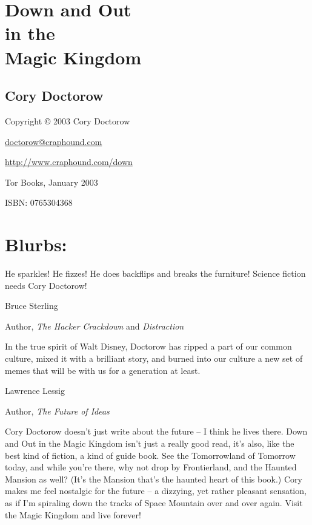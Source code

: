 


\section{Down and Out\\in the\\Magic Kingdom}

\subsection{Cory Doctorow}

Copyright © 2003 Cory Doctorow

\href{mailto:doctorow@craphound.com}{doctorow@craphound.com}

\href{http://www.craphound.com/down}{http://www.craphound.com/down}

Tor Books, January 2003

ISBN: 0765304368

\section{Blurbs:}

He sparkles! He fizzes! He does backflips and breaks the furniture!
Science fiction needs Cory Doctorow!

Bruce Sterling

Author, \emph{The Hacker Crackdown} and \emph{Distraction}

In the true spirit of Walt Disney, Doctorow has ripped a part of
our common culture, mixed it with a brilliant story, and burned
into our culture a new set of memes that will be with us for a
generation at least.

Lawrence Lessig

Author, \emph{The Future of Ideas}

Cory Doctorow doesn't just write about the future -- I think he
lives there. Down and Out in the Magic Kingdom isn't just a really
good read, it's also, like the best kind of fiction, a kind of
guide book. See the Tomorrowland of Tomorrow today, and while
you're there, why not drop by Frontierland, and the Haunted Mansion
as well? (It's the Mansion that's the haunted heart of this book.)
Cory makes me feel nostalgic for the future -- a dizzying, yet
rather pleasant sensation, as if I'm spiraling down the tracks of
Space Mountain over and over again. Visit the Magic Kingdom and
live forever!

